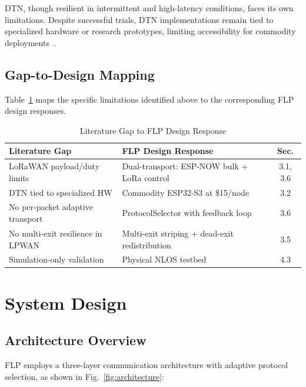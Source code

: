 \documentclass[conference]{IEEEtran}
\begin{document}
DTN, though resilient in intermittent and high-latency conditions, faces its own limitations. Despite successful trials, DTN implementations remain tied to specialized hardware or research prototypes, limiting accessibility for commodity deployments~\cite{castillo2024dtn}.

\subsection{Gap-to-Design Mapping}

Table~\ref{tab:gap_mapping} maps the specific limitations identified above to the corresponding FLP design responses.

\begin{table}[htbp]
  \centering
  \caption{Literature Gap to FLP Design Response}
  \label{tab:gap_mapping}
  \begin{tabular}{@{}p{3.2cm}p{3.2cm}c@{}}
    \toprule
    \textbf{Literature Gap} & \textbf{FLP Design Response} & \textbf{Sec.} \\
    \midrule
    LoRaWAN payload/duty limits & Dual-transport: ESP-NOW bulk + LoRa control & 3.1, 3.6 \\
    DTN tied to specialized HW & Commodity ESP32-S3 at \$15/node & 3.2 \\
    No per-packet adaptive transport & ProtocolSelector with feedback loop & 3.6 \\
    No multi-exit resilience in LPWAN & Multi-exit striping + dead-exit redistribution & 3.5 \\
    Simulation-only validation & Physical NLOS testbed & 4.3 \\
    \bottomrule
  \end{tabular}
\end{table}

\section{System Design}
\label{sec:design}

\subsection{Architecture Overview}

FLP employs a three-layer communication architecture with adaptive protocol selection, as shown in Fig.~\ref{fig:architecture}:
\end{document}
